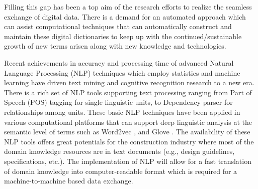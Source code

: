 \documentclass[Journal, BackFigs, DoubleSpace]{ascelike} %
\begin{document}
Filling this gap has been a top aim of the research efforts to realize the seamless exchange of digital data. There is a demand for an automated approach which can assist computational techniques that can automatically construct and maintain these digital dictionaries to keep up with the continued/sustainable growth of new terms arisen along with new knowledge and technologies. 
\par
Recent achievements in accuracy and processing time of advanced Natural Language Processing (NLP) techniques which employ statistics and machine learning have driven text mining and cognitive recognition research to a new era. There is a rich set of NLP tools supporting text processing ranging from  Part of Speech (POS) tagging \cite{Toutanova03,Cunningham02} for single linguistic units, to Dependency parser \cite{chen14} for relationships among units. These basic NLP techniques have been applied in various computational platforms that can support deep linguistic analysis at the semantic level of terms such as Word2vec \cite{mikolov13a}, and Glove \cite{pennington2014glove}. The availability of these NLP tools offers great potentials for the construction industry where most of the domain knowledge resources are in text documents (e.g., design guidelines, specifications, etc.). The implementation of NLP will allow for a fast translation of domain knowledge into computer-readable format which is required for a machine-to-machine based data exchange.
\par
\end{document}
